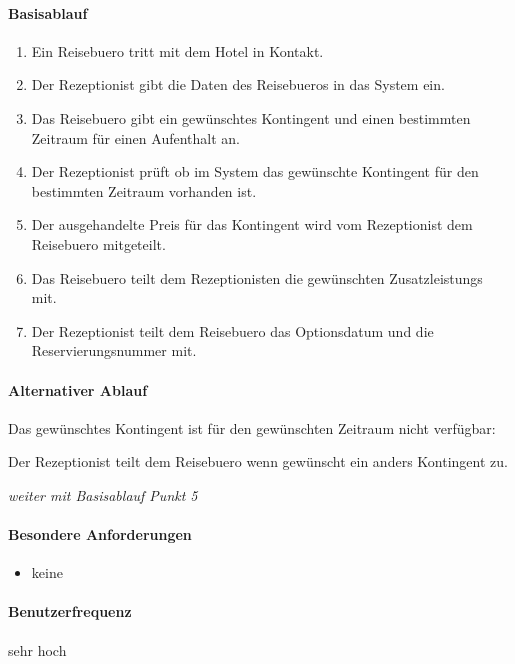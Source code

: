 \paragraph{Basisablauf}
\begin{enumerate}
	\item Ein \Gls{Reisebuero} tritt mit dem Hotel in Kontakt.
	\item Der \Gls{Rezeptionist} gibt die Daten des \Gls{Reisebuero}s in das System ein.
	\item Das \Gls{Reisebuero} gibt ein gewünschtes \Gls{Kontingent} und einen bestimmten Zeitraum für einen Aufenthalt an. 
    \item Der \Gls{Rezeptionist} prüft ob im System das gewünschte \Gls{Kontingent} für den bestimmten Zeitraum vorhanden ist. 
	\item Der ausgehandelte Preis für das \Gls{Kontingent} wird vom \Gls{Rezeptionist} dem \Gls{Reisebuero} mitgeteilt.
	\item Das \Gls{Reisebuero} teilt dem \Gls{Rezeptionist}en die gewünschten \Glspl{Zusatzleistung} mit.
	\item Der \Gls{Rezeptionist} teilt dem \Gls{Reisebuero} das \Gls{Optionsdatum} und die \Gls{Reservierungsnummer} mit.
\end{enumerate}

\paragraph{Alternativer Ablauf}
\begin{longenum}
	\item
	\item
	\item
	\item
	\begin{longenum}
		\item Das gewünschtes \Gls{Kontingent} ist für den gewünschten Zeitraum nicht
		verfügbar:
		\begin{longenum}
			\item Der \Gls{Rezeptionist} teilt dem \Gls{Reisebuero} wenn gewünscht ein anders \Gls{Kontingent} zu.
			\item \emph{weiter mit Basisablauf Punkt 5}
		\end{longenum}
	\end{longenum}
	\item
	\item
	\item
\end{longenum}

\paragraph{Besondere Anforderungen}
\begin{itemize}
	\item keine
\end{itemize}

\paragraph{Benutzerfrequenz}
sehr hoch

\newpage

